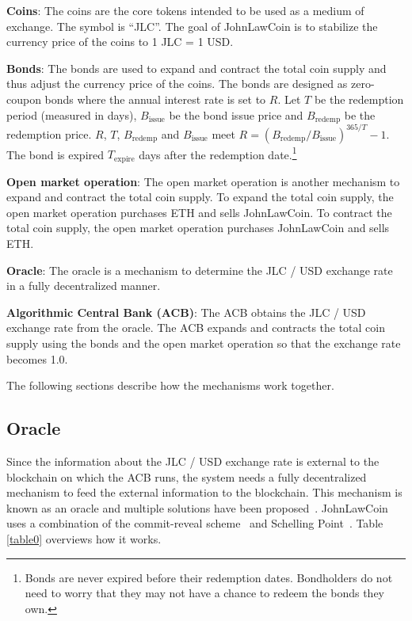 \documentclass[dvipdfmx,a4paper]{article}
\begin{document}
\begin{description}
\item{\textbf{Coins}}: The coins are the core tokens intended to be used as a medium of exchange. The symbol is ``JLC''. The goal of JohnLawCoin is to stabilize the currency price of the coins to 1 JLC = 1 USD.
\item{\textbf{Bonds}}: The bonds are used to expand and contract the total coin supply and thus adjust the currency price of the coins. The bonds are designed as zero-coupon bonds where the annual interest rate is set to $R$. Let $T$ be the redemption period (measured in days), $B_{\mathrm{issue}}$ be the bond issue price and $B_{\mathrm{redemp}}$ be the redemption price. $R$, $T$, $B_{\mathrm{redemp}}$ and $B_{\mathrm{issue}}$ meet $R=(B_{\mathrm{redemp}}/B_{\mathrm{issue}})^{365/T}-1$. The bond is expired $T_{\mathrm{expire}}$ days after the redemption date.\footnote{Bonds are never expired before their redemption dates. Bondholders do not need to worry that they may not have a chance to redeem the bonds they own.}
\item{\textbf{Open market operation}}: The open market operation is another mechanism to expand and contract the total coin supply. To expand the total coin supply, the open market operation purchases ETH and sells JohnLawCoin. To contract the total coin supply, the open market operation purchases JohnLawCoin and sells ETH.
\item{\textbf{Oracle}}: The oracle is a mechanism to determine the JLC / USD exchange rate in a fully decentralized manner.
\item{\textbf{Algorithmic Central Bank (ACB)}}: The ACB obtains the JLC / USD exchange rate from the oracle. The ACB expands and contracts the total coin supply using the bonds and the open market operation so that the exchange rate becomes 1.0.
\end{description}

The following sections describe how the mechanisms work together.

\subsection{Oracle}

Since the information about the JLC / USD exchange rate is external to the blockchain on which the ACB runs, the system needs a fully decentralized mechanism to feed the external information to the blockchain. This mechanism is known as an oracle and multiple solutions have been proposed~\cite{chainlink,adler2018astraea}. JohnLawCoin uses a combination of the commit-reveal scheme~\cite{wohrer2018design} and Schelling Point~\cite{shellingpoint}. Table \ref{table0} overviews how it works.
\end{document}

